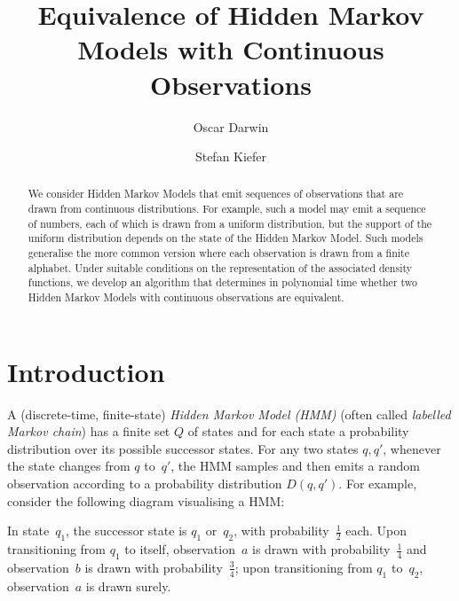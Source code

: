 \documentclass[a4paper,UKenglish,cleveref, autoref,mathscr]{lipics-v2019}
\title{Equivalence of Hidden Markov Models with Continuous Observations}
\author{Oscar Darwin}{Department of Computer Science, Oxford University, United Kingdom }{}{https://orcid.org/0000-0001-5016-014X}{}%
\author{Stefan Kiefer}{Department of Computer Science, Oxford University, United Kingdom}{}{https://orcid.org/0000-0003-4173-6877}{}
\newcommand{\1}{\mathbbm{1}}
\begin{document}
\maketitle

\begin{abstract}
We consider Hidden Markov Models that emit sequences of observations that are drawn from continuous distributions. For example, such a model may emit a sequence of numbers, each of which is drawn from a uniform distribution, but the support of the uniform distribution depends on the state of the Hidden Markov Model. Such models generalise the more common version where each observation is drawn from a finite alphabet. Under suitable conditions on the representation of the associated density functions, we develop an algorithm that determines in polynomial time whether two Hidden Markov Models with continuous observations are equivalent.
\end{abstract}

\section{Introduction}

A (discrete-time, finite-state) \emph{Hidden Markov Model (HMM)} (often called \emph{labelled Markov chain}) has a finite set $Q$ of states and for each state a probability distribution over its possible successor states.
For any two states $q, q'$, whenever the state changes from $q$ to~$q'$, the HMM samples and then emits a random observation according to a probability distribution $D(q, q')$.
For example, consider the following diagram visualising a HMM:
\begin{center}
\end{center}
In state~$q_1$, the successor state is $q_1$ or~$q_2$, with probability~$\frac12$ each.
Upon transitioning from $q_1$ to itself, observation~$a$ is drawn with probability~$\frac14$ and observation~$b$ is drawn with probability~$\frac34$; upon transitioning from $q_1$ to~$q_2$, observation~$a$ is drawn surely.
\end{document}
